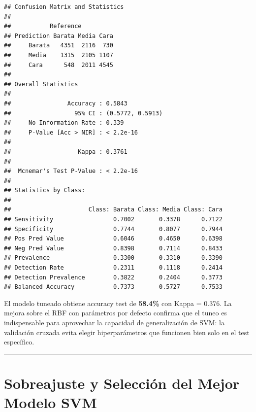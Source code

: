 \documentclass[
]{article}
\begin{document}
\begin{verbatim}
## Confusion Matrix and Statistics
## 
##           Reference
## Prediction Barata Media Cara
##     Barata   4351  2116  730
##     Media    1315  2105 1107
##     Cara      548  2011 4545
## 
## Overall Statistics
##                                           
##                Accuracy : 0.5843          
##                  95% CI : (0.5772, 0.5913)
##     No Information Rate : 0.339           
##     P-Value [Acc > NIR] : < 2.2e-16       
##                                           
##                   Kappa : 0.3761          
##                                           
##  Mcnemar's Test P-Value : < 2.2e-16       
## 
## Statistics by Class:
## 
##                      Class: Barata Class: Media Class: Cara
## Sensitivity                 0.7002       0.3378      0.7122
## Specificity                 0.7744       0.8077      0.7944
## Pos Pred Value              0.6046       0.4650      0.6398
## Neg Pred Value              0.8398       0.7114      0.8433
## Prevalence                  0.3300       0.3310      0.3390
## Detection Rate              0.2311       0.1118      0.2414
## Detection Prevalence        0.3822       0.2404      0.3773
## Balanced Accuracy           0.7373       0.5727      0.7533
\end{verbatim}

El modelo tuneado obtiene accuracy test de \textbf{58.4\%} con Kappa =
0.376. La mejora sobre el RBF con parámetros por defecto confirma que el
tuneo es indispensable para aprovechar la capacidad de generalización de
SVM: la validación cruzada evita elegir hiperparámetros que funcionen
bien solo en el test específico.

\begin{center}\rule{0.5\linewidth}{0.5pt}\end{center}

\section{Sobreajuste y Selección del Mejor Modelo
SVM}\label{sobreajuste-y-selecciuxf3n-del-mejor-modelo-svm}
\end{document}
